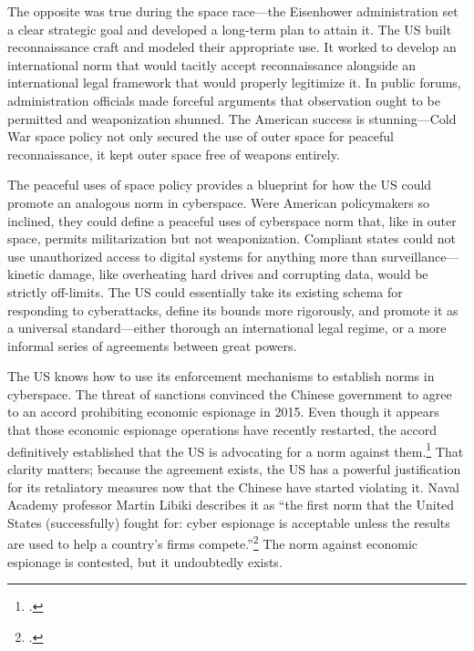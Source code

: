 \documentclass[11pt]{memoir}
\begin{document}
The opposite was true during the space race---the Eisenhower administration set a clear strategic goal and developed a long-term plan to attain it. The US built reconnaissance craft and modeled their appropriate use. It worked to develop an international norm that would tacitly accept reconnaissance alongside an international legal framework that would properly legitimize it. In public forums, administration officials made forceful arguments that observation ought to be permitted and weaponization shunned. The American success is stunning---Cold War space policy not only secured the use of outer space for peaceful reconnaissance, it kept outer space free of weapons entirely.

The peaceful uses of space policy provides a blueprint for how the US could promote an analogous norm in cyberspace. Were American policymakers so inclined, they could define a peaceful uses of cyberspace norm that, like in outer space, permits militarization but not weaponization. Compliant states could not use unauthorized access to digital systems for anything more than surveillance---kinetic damage, like overheating hard drives and corrupting data, would be strictly off-limits. The US could essentially take its existing schema for responding to cyberattacks, define its bounds more rigorously, and promote it as a universal standard---either thorough an international legal regime, or a more informal series of agreements between great powers.

The US knows how to use its enforcement mechanisms to establish norms in cyberspace. The threat of sanctions convinced the Chinese government to agree to an accord prohibiting economic espionage in 2015. Even though it appears that those economic espionage operations have recently restarted, the accord definitively established that the US is advocating for a norm against them.\footcite{bartz_u.s._2018} That clarity matters; because the agreement exists, the US has a powerful justification for its retaliatory measures now that the Chinese have started violating it. Naval Academy professor Martin Libiki describes it as ``the first norm that the United States (successfully) fought for: cyber espionage is acceptable unless the results are used to help a country’s firms compete.''\footcite{libicki_coming_2017} The norm against economic espionage is contested, but it undoubtedly exists.
\end{document}
